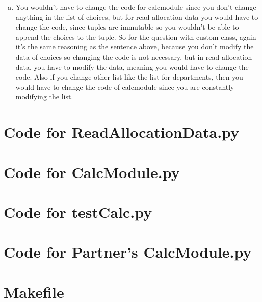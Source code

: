 \documentclass[12pt]{article}
\begin{document}
\begin{enumerate}[(a)]
\item
You wouldn't have to change the code for calcmodule since you don't change anything in the list of choices, but for read allocation data you would have to change the code, since tuples are immutable so you wouldn't be able to append the choices to the tuple. So for the question with custom class, again it's the same reasoning as the sentence above, because you don't modify the data of choices so changing the code is not necessary, but in read allocation data, you have to modify the data, meaning you would have to change the code. Also if you change other list like the list for departments, then you would have to change the code of calcmodule since you are constantly modifying the list. 

\end{enumerate}

\newpage

\lstset{language=Python, basicstyle=\tiny, breaklines=true, showspaces=false,
  showstringspaces=false, breakatwhitespace=true}

\def\thesection{\Alph{section}}

\section{Code for ReadAllocationData.py}

\noindent 

\newpage

\section{Code for CalcModule.py}

\noindent 

\newpage

\section{Code for testCalc.py}

\noindent 

\newpage

\section{Code for Partner's CalcModule.py}

\noindent 

\newpage

\section{Makefile}

\lstset{language=make}
\noindent 
\end{document}
